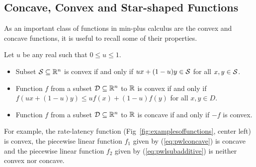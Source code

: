 \subsection{Concave, Convex and Star-shaped Functions}
As an important class of functions in min-plus calculus
are the convex and concave functions, it is useful to recall
some of their properties.
\begin{definition}
Let $u$ be any real such that $0 \leq u \leq 1$.
\begin{itemize}
\item{Subset $\mathcal S \subseteq \mathbb{R}^{n}$ is convex if and only if
$ux + (1-u)y \in \mathcal S$ for all $x,y \in \mathcal S$.}
\item{Function $f$ from a subset $\mathcal D \subseteq \mathbb{R}^{n}$ to $\mathbb{R}$
is convex if and only if $f(ux + (1-u)y) \leq uf(x) + (1-u)f(y)$ for all $x,y \in D$.}
\item{Function $f$ from a subset $\mathcal D \subseteq \mathbb{R}^{n}$ to $\mathbb{R}$ is concave
if and only if $-f$ is convex.}
\end{itemize}
\end{definition}
For example, the rate-latency function (Fig~\ref{fig:examplesoffunctions}, center left) is convex,
the piecewise linear function $f_1$ given by (\ref{eq:pwlconcave}) is concave and
the piecewise linear function $f_2$ given by (\ref{eq:pwlsubadditive}) is neither
convex nor concave.

